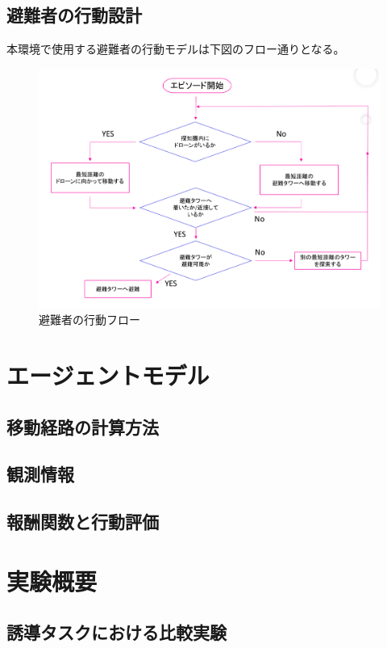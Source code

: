 \subsection{避難者の行動設計}
本環境で使用する避難者の行動モデルは下図のフロー通りとなる。
\begin{figure}[H] 
  \centering 
  \includegraphics[width=1.0\textwidth]{Figures/334170449-c22ed682-06c1-4fbc-ba4b-07d946d8a047.png}
  \caption{避難者の行動フロー} 
  \label{fig:01} 
\end{figure}


\section{エージェントモデル}
  \subsection{移動経路の計算方法}
  \subsection{観測情報}
  \subsection{報酬関数と行動評価}


\section{実験概要}
  \subsection{誘導タスクにおける比較実験}
